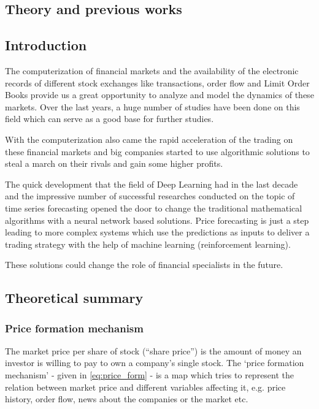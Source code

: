 \documentclass[11pt,a4paper,oneside]{article}
\begin{document}
\begin{center}
  \section{Theory and previous works}
  \label{sec:theory_prev}
\end{center}

\subsection{Introduction}
\label{sec:introduction}

The computerization of financial markets and the availability of the electronic records of different stock exchanges 
like transactions, order flow and Limit Order Books provide us a great opportunity to analyze and model the dynamics of 
these markets. Over the last years, a huge number of studies have been done on this field which can serve as a good base 
for further studies.

With the computerization also came the rapid acceleration of the trading on these financial markets and big companies 
started to use algorithmic solutions to steal a march on their rivals and gain some higher profits.

The quick development that the field of Deep Learning had in the last decade and the impressive number of successful 
researches conducted on the topic of time series forecasting opened the door to change the traditional mathematical 
algorithms with a neural network based solutions. Price forecasting is just a step leading to more complex systems 
which use the predictions as inputs to deliver a trading strategy with the help of machine learning 
(reinforcement learning).

These solutions could change the role of financial specialists in the future.

\subsection{Theoretical summary}
\label{sec:theoretical_summary}

  \subsubsection{Price formation mechanism}
  \label{sec:price_formation_mechanism}
  
  The market price per share of stock (“share price”) is the amount of money an investor is willing to pay to own 
  a company's single stock. The ‘price formation mechanism’ - given in \autoref{eq:price_form} - is a map which tries to 
  represent the relation between market price and different variables affecting it, e.g. price history, order flow, 
  news about the companies or the market etc.
\end{document}
